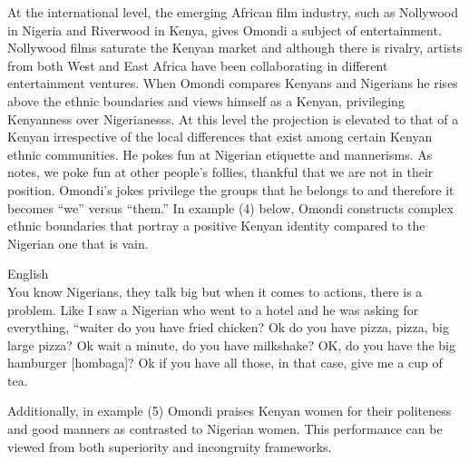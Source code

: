 \documentclass[output=paper]{langsci/langscibook}
\begin{document}
  At the international level, the emerging African film industry, such as Nollywood in Nigeria and Riverwood in Kenya, gives Omondi a subject of entertainment. Nollywood films saturate the Kenyan market and although there is rivalry, artists from both West and East Africa have been collaborating in different entertainment ventures. When Omondi compares Kenyans and Nigerians he rises above the ethnic boundaries and views himself as a Kenyan, privileging Kenyanness over Nigerianesss. At this level the projection is elevated to that of a Kenyan irrespective of the local differences that exist among certain Kenyan ethnic communities. He pokes fun at Nigerian etiquette and mannerisms. As \citet{Labraddor2004} notes, we poke fun at other people’s follies, thankful that we are not in their position. Omondi’s jokes privilege the groups that he belongs to and therefore it becomes “we” versus “them.” In example (4) below, Omondi constructs complex ethnic boundaries that portray a positive Kenyan identity compared to the Nigerian one that is vain.

\ea
{English }\\
  You know Nigerians, they talk big but when it comes to actions, there is a problem. Like I saw a Nigerian who went to a hotel and he was asking for everything, “waiter do you have fried chicken? Ok do you have pizza, pizza, big large pizza? Ok wait a minute, do you have milkshake? OK, do you have the big hamburger \textup{[hombaga]}? Ok if you have all those, in that case, give me a cup of tea. \\
  \citep{Omogi2012a}
\z

Additionally, in example (5) Omondi praises Kenyan women for their politeness and good manners as contrasted to Nigerian women. This performance can be viewed from both superiority and incongruity frameworks.
\end{document}

